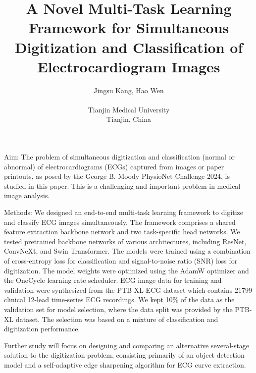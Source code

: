 \documentclass{cinc-abstract}
\begin{document}
\title{A Novel Multi-Task Learning Framework for Simultaneous Digitization and Classification of Electrocardiogram Images}

\author {Jingsu Kang, Hao Wen\\ %
\ \\ %
Tianjin Medical University\\  %
Tianjin, China} %

\maketitle



Aim: The problem of simultaneous digitization and classification (normal or abnormal) of electrocardiograms (ECGs) captured from images or paper printouts, as posed by the George B. Moody PhysioNet Challenge 2024, is studied in this paper. This is a challenging and important problem in medical image analysis.

Methods: We designed an end-to-end multi-task learning framework to digitize and classify ECG images simultaneously. The framework comprises a shared feature extraction backbone network and two task-specific head networks. We tested pretrained backbone networks of various architectures, including ResNet, ConvNeXt, and Swin Transformer. The models were trained using a combination of cross-entropy loss for classification and signal-to-noise ratio (SNR) loss for digitization. The model weights were optimized using the AdamW optimizer and the OneCycle learning rate scheduler. ECG image data for training and validation were synthesized from the PTB-XL ECG dataset which contains 21799 clinical 12-lead time-series ECG recordings. We kept 10\% of the data as the validation set for model selection, where the data split was provided by the PTB-XL dataset. The selection was based on a mixture of classification and digitization performance.

Further study will focus on designing and comparing an alternative several-stage solution to the digitization problem, consisting primarily of an object detection model and a self-adaptive edge sharpening algorithm for ECG curve extraction.
\end{document}
